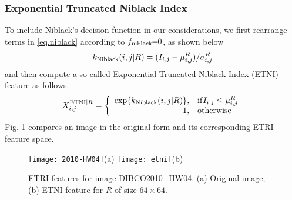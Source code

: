 \documentclass[onecolumn,11pt,draftcls,journal]{IEEEtran}
\def\fwI{.25}
\begin{document}
\subsubsection{Exponential Truncated Niblack Index}
To include Niblack's decision function in our considerations, we first rearrange terms in \eqref{eq.niblack} according to $f_{\rm niblack}\!\!=\!\!0$, as shown below
\begin{equation}
k_{\rm{Niblack}}(i,j|R)= (I_{i,j}-\mu_{i,j}^R)/\sigma_{i,j}^{R}
\end{equation} 
and then compute a so-called Exponential Truncated Niblack Index (ETNI) feature as follows.
\begin{equation}
X_{i,j}^{{\rm{ETNI}}|R} =\left\{
\begin{array}{rl}
\exp\{k_{\rm{Niblack}}(i,j|R)\},&{\rm if} I_{i,j}\leq\mu_{i,j}^R\\
1,&\rm otherwise
\end{array}
\right.
\label{eq.TNI}
\end{equation}
Fig. \ref{fig.etni} compares an image in the original form and its corresponding ETRI feature space. %

\begin{figure}[!h]
\centering\scriptsize
\texttt{[image: 2010-HW04]}{(a)}
\texttt{[image: etni]}{(b)}
\caption{ETRI features for image DIBCO2010\_HW04. (a) Original image; (b) ETNI feature for $R$ of size $64\times 64$. }\label{fig.etni}
\end{figure}
\end{document}
